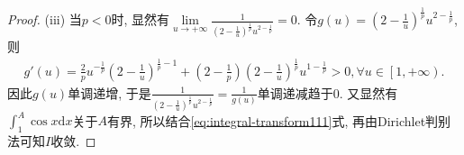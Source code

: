 \documentclass[../../main.tex]{subfiles}
\begin{document}
\begin{proof}
(iii) 当$p<0$时, 显然有$\underset{u\rightarrow +\infty}{\lim}\frac{1}{\left( 2-\frac{1}{u} \right) ^{\frac{1}{p}}u^{2-\frac{1}{p}}}=0$. 令$g\left( u \right) =\left( 2-\frac{1}{u} \right) ^{\frac{1}{p}}u^{2-\frac{1}{p}}$, 则
\begin{align*}
g'\left( u \right) =\frac{2}{p}u^{-\frac{1}{p}}\left( 2-\frac{1}{u} \right) ^{\frac{1}{p}-1}+\left( 2-\frac{1}{p} \right) \left( 2-\frac{1}{u} \right) ^{\frac{1}{p}}u^{1-\frac{1}{p}}>0,\forall u\in \left[ 1,+\infty \right).
\end{align*}
因此$g\left( u \right)$单调递增, 于是$\frac{1}{\left( 2-\frac{1}{u} \right) ^{\frac{1}{p}}u^{2-\frac{1}{p}}}=\frac{1}{g\left( u \right)}$单调递减趋于$0$. 又显然有$\int_1^A{\cos x\mathrm{d}x}$关于$A$有界, 所以结合\eqref{eq:integral-transform111}式, 再由Dirichlet判别法可知$I$收敛.
\end{proof}
\end{document}
